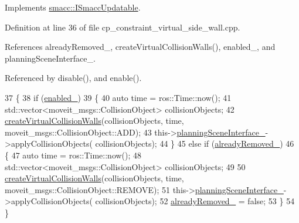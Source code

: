 Implements \hyperlink{classsmacc_1_1ISmaccUpdatable_a84ee0520cbefdb1d412bed54650b028e}{smacc\+::\+I\+Smacc\+Updatable}.



Definition at line 36 of file cp\+\_\+constraint\+\_\+virtual\+\_\+side\+\_\+wall.\+cpp.



References already\+Removed\+\_\+, create\+Virtual\+Collision\+Walls(), enabled\+\_\+, and planning\+Scene\+Interface\+\_\+.



Referenced by disable(), and enable().


\begin{DoxyCode}
37         \{
38             \textcolor{keywordflow}{if} (\hyperlink{classsm__fetch__six__table__pick__n__sort__1_1_1cl__move__group__interface_1_1CpConstraintVirtualSideWall_a9018eb6e7d9b369e39ad70315192ab92}{enabled\_})
39             \{
40                 \textcolor{keyword}{auto} time = ros::Time::now();
41                 std::vector<moveit\_msgs::CollisionObject> collisionObjects;
42                 \hyperlink{classsm__fetch__six__table__pick__n__sort__1_1_1cl__move__group__interface_1_1CpConstraintVirtualSideWall_a7955eab48e3804a396bd91092c59094b}{createVirtualCollisionWalls}(collisionObjects, time, 
      moveit\_msgs::CollisionObject::ADD);
43                 this->\hyperlink{classsm__fetch__six__table__pick__n__sort__1_1_1cl__move__group__interface_1_1CpConstraintVirtualSideWall_a691e884fffbc5e310745d0ac1fc594b4}{planningSceneInterface\_}->applyCollisionObjects(
      collisionObjects);
44             \}
45             \textcolor{keywordflow}{else} \textcolor{keywordflow}{if} (\hyperlink{classsm__fetch__six__table__pick__n__sort__1_1_1cl__move__group__interface_1_1CpConstraintVirtualSideWall_a951469ee4d4da92580c5a9604800a2ce}{alreadyRemoved\_})
46             \{
47                 \textcolor{keyword}{auto} time = ros::Time::now();
48                 std::vector<moveit\_msgs::CollisionObject> collisionObjects;
49 
50                 \hyperlink{classsm__fetch__six__table__pick__n__sort__1_1_1cl__move__group__interface_1_1CpConstraintVirtualSideWall_a7955eab48e3804a396bd91092c59094b}{createVirtualCollisionWalls}(collisionObjects, time, 
      moveit\_msgs::CollisionObject::REMOVE);
51                 this->\hyperlink{classsm__fetch__six__table__pick__n__sort__1_1_1cl__move__group__interface_1_1CpConstraintVirtualSideWall_a691e884fffbc5e310745d0ac1fc594b4}{planningSceneInterface\_}->applyCollisionObjects(
      collisionObjects);
52                 \hyperlink{classsm__fetch__six__table__pick__n__sort__1_1_1cl__move__group__interface_1_1CpConstraintVirtualSideWall_a951469ee4d4da92580c5a9604800a2ce}{alreadyRemoved\_} = \textcolor{keyword}{false};
53             \}
54         \}
\end{DoxyCode}
